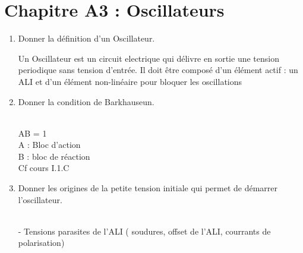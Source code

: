 \section*{\centering Chapitre A3 : Oscillateurs}
\begin{enumerate}[label=\arabic{enumi} - , left=0pt, itemsep=1em] %

    \item Donner la définition d'un Oscillateur. \par
    \begin{solution}
          Un Oscillateur est un circuit electrique qui délivre en sortie une tension periodique sans tension d'entrée. Il doit 
          être composé d'un élément actif : un ALI et d'un élément non-linéaire pour bloquer les oscillations
    \end{solution}

    \item Donner la condition de Barkhauseun. \par
    \begin{solution} \\
        AB = 1\\
        A : Bloc d'action \\
        B : bloc de réaction\\
        Cf cours I.1.C
    \end{solution}

    \item Donner les origines de la petite tension initiale qui permet de démarrer l'oscillateur. \par
    \begin{solution} \\
        - Tensions parasites de l'ALI ( soudures, offset de l'ALI, courrants de polarisation)
    \end{solution}
    
\end{enumerate}


